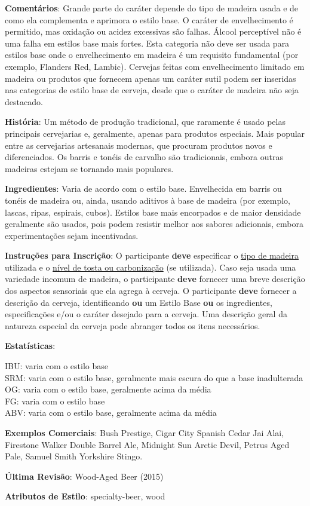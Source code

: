 \textbf{Comentários}: Grande parte do caráter depende do tipo de madeira usada e de como ela complementa e aprimora o estilo base. O caráter de envelhecimento é permitido, mas oxidação ou acidez excessivas são falhas. Álcool perceptível não é uma falha em estilos base mais fortes. Esta categoria não deve ser usada para estilos base onde o envelhecimento em madeira é um requisito fundamental (por exemplo, Flanders Red, Lambic). Cervejas feitas com envelhecimento limitado em madeira ou produtos que fornecem apenas um caráter sutil podem ser inseridas nas categorias de estilo base de cerveja, desde que o caráter de madeira não seja destacado.

\textbf{História}: Um método de produção tradicional, que raramente é usado pelas principais cervejarias e, geralmente, apenas para produtos especiais. Mais popular entre as cervejarias artesanais modernas, que procuram produtos novos e diferenciados. Os barris e tonéis de carvalho são tradicionais, embora outras madeiras estejam se tornando mais populares.

\textbf{Ingredientes}: Varia de acordo com o estilo base. Envelhecida em barris ou tonéis de madeira ou, ainda, usando aditivos à base de madeira (por exemplo, lascas, ripas, espirais, cubos). Estilos base mais encorpados e de maior densidade geralmente são usados, pois podem resistir melhor aos sabores adicionais, embora experimentações sejam incentivadas.

\textbf{Instruções para Inscrição}: O participante \textbf{deve} especificar o \underline{tipo de madeira} utilizada e o \underline{nível de tosta ou carbonização} (se utilizada). Caso seja usada uma variedade incomum de madeira, o participante \textbf{deve} fornecer uma breve descrição dos aspectos sensoriais que ela agrega à cerveja. O participante \textbf{deve} fornecer a descrição da cerveja, identificando \textbf{ou} um Estilo Base \textbf{ou} os ingredientes, especificações e/ou o caráter desejado para a cerveja. Uma descrição geral da natureza especial da cerveja pode abranger todos os itens necessários.

\textbf{Estatísticas}:

IBU: varia com o estilo base\\
SRM: varia com o estilo base, geralmente mais escura do que a base inadulterada\\
OG: varia com o estilo base, geralmente acima da média\\
FG: varia com o estilo base\\
ABV: varia com o estilo base, geralmente acima da média

\textbf{Exemplos Comerciais}: Bush Prestige, Cigar City Spanish Cedar Jai Alai, Firestone Walker Double Barrel Ale, Midnight Sun Arctic Devil, Petrus Aged Pale, Samuel Smith Yorkshire Stingo.

\textbf{Última Revisão}: Wood-Aged Beer (2015)

\textbf{Atributos de Estilo}: specialty-beer, wood
